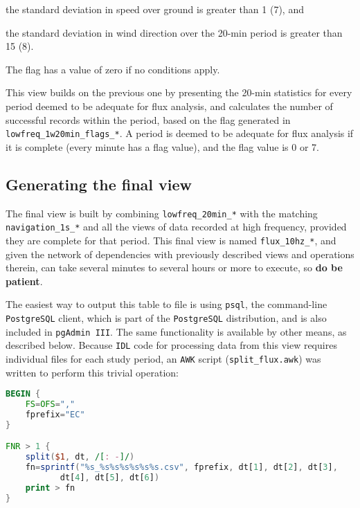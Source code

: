 \documentclass[12pt,letterpaper,titlepage,headings=small,numbers=noenddot]%
{scrartcl}
\begin{document}
\begin{description}
\begin{inparaenum}[a)]
  \item the standard deviation in speed over ground is greater than 1 (7),
    and
  \item the standard deviation in wind direction over the 20-min period is
    greater than 15 (8).
  \end{inparaenum}  The flag has a value of zero if no conditions apply.
\item[\texttt{lowfreq\_20min\_fluxable\_*}] This view builds on the
  previous one by presenting the 20-min statistics for every period deemed
  to be adequate for flux analysis, and calculates the number of successful
  records within the period, based on the flag generated in
  \texttt{lowfreq\_1w20min\_flags\_*}.  A period is deemed to be adequate
  for flux analysis if it is complete (every minute has a flag value), and
  the flag value is 0 or 7.
\end{description}


\subsection{Generating the final view}
\label{sec:final-view}

The final view is built by combining \texttt{lowfreq\_20min\_*} with the
matching \texttt{navigation\_1s\_*} and all the views of data recorded at
high frequency, provided they are complete for that period.  This final
view is named \texttt{flux\_10hz\_*}, and given the network of dependencies
with previously described views and operations therein, can take several
minutes to several hours or more to execute, so \textbf{do be patient}.

The easiest way to output this table to file is using \texttt{psql}, the
command-line \texttt{PostgreSQL} client, which is part of the
\texttt{PostgreSQL} distribution, and is also included in \texttt{pgAdmin
  III}.  The same functionality is available by other means, as described
below.  Because \texttt{IDL} code for processing data from this view
requires individual files for each study period, an \texttt{AWK} script
(\texttt{split\_flux.awk}) was written to perform this trivial operation:

\begin{lstlisting}[language=awk, frame=single]
BEGIN {
    FS=OFS=","
    fprefix="EC"
}

FNR > 1 {
    split($1, dt, /[: -]/)
    fn=sprintf("%s_%s%s%s%s%s%s.csv", fprefix, dt[1], dt[2], dt[3],
	       dt[4], dt[5], dt[6])
    print > fn
}
\end{lstlisting}
\end{document}
